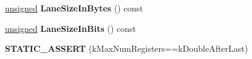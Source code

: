 \begin{DoxyCompactItemize}
\item 
\mbox{\label{classv8_1_1internal_1_1VRegister_aa2f697759c4d8dd44a705c35a5875f58}} 
\mbox{\hyperlink{classunsigned}{unsigned}} {\bfseries Lane\+Size\+In\+Bytes} () const
\item 
\mbox{\label{classv8_1_1internal_1_1VRegister_a8a5813a7e431f566421a4f7af48c3548}} 
\mbox{\hyperlink{classunsigned}{unsigned}} {\bfseries Lane\+Size\+In\+Bits} () const
\item 
\mbox{\label{classv8_1_1internal_1_1VRegister_a62bc1c6e8e2117ae29e79062f83a0dac}} 
{\bfseries S\+T\+A\+T\+I\+C\+\_\+\+A\+S\+S\+E\+RT} (k\+Max\+Num\+Registers==k\+Double\+After\+Last)
\end{DoxyCompactItemize}
